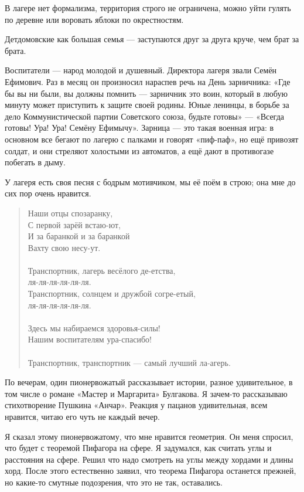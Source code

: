 \documentclass{book}
\begin{document}
В лагере нет формализма, территория строго не ограничена, можно уйти гулять по деревне или воровать яблоки по окрестностям.

Детдомовские как большая семья --- заступаются друг за друга круче, чем брат за брата.

Воспитатели --- народ молодой и душевный.
Директора лагеря звали Семён Ефимович.
Раз в месяц он произносил нараспев речь на День зарничника:
«Где бы вы ни были, вы должны помнить --- зарничник это воин, который в любую минуту может приступить к защите своей родины.
Юные ленинцы, в борьбе за дело Коммунистической партии Советского союза, будьте готовы» --- «Всегда готовы! Ура! Ура! Семёну Ефимычу».
Зарница --- это такая военная игра: в основном все бегают по лагерю с палками и говорят «пиф-паф»,
но  ещё привозят солдат, и они стреляют холостыми из автоматов, а
ещё дают в противогазе побегать в дыму.

У лагеря есть своя песня с бодрым мотивчиком, мы её поём в строю;
она мне до сих пор очень нравится.

\begin{verse}
Наши отцы спозаранку,
\\
С первой зарёй встаю-ют,
\\
И за баранкой и за баранкой
\\
Вахту свою несу-ут.
\\
\ 
\\
Транспортник, лагерь весёлого де-етства,
\\ 
\qquad ля-ля-ля-ля-ля-ля.
\\
Транспортник, солнцем и дружбой согре-етый,
\\ 
\qquad ля-ля-ля-ля-ля-ля.
\\
\ 
\\
Здесь мы набираемся здоровья-силы!
\\
Нашим воспитателям ура-спасибо!
\\
\ 
\\
Транспортник, транспортник --- самый лучший ла-агерь.
\end{verse}

По вечерам, один пионервожатый рассказывает истории, разное удивительное, в том числе о романе «Мастер и Маргарита» Булгакова.
Я зачем-то рассказываю стихотворение Пушкина «Анчар». 
Реакция у пацанов удивительная, всем нравится, читаю его чуть не каждый вечер.

Я сказал этому пионервожатому, что мне нравится геометрия.
Он меня спросил, что будет с теоремой Пифагора на сфере.
Я задумался, как считать углы и расстояния на сфере. 
Решил что надо смотреть на углы между хордами и длины хорд.
После этого естественно заявил, что теорема Пифагора останется прежней, но какие-то смутные подозрения, что это не так, оставались.
\end{document}
